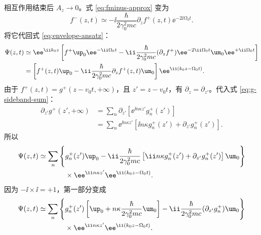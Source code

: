相互作用结束后 $A_z\to0$。式 \eqref{eq:fminus-approx} 变为
\begin{equation}
 f^-(z,t)
 \simeq
 -\ii\frac{\hbar}{2\gamma_0^2mc}
 \partial_zf^+(z,t)\ee^{-2\ii\Omega_0t}.
 \label{eq:fminus-free}
\end{equation}
将它代回式 \eqref{eq:envelope-ansatz}：
\begin{align}
 \Psi(z,t)
 &\simeq\ee^{\ii k_0z}
 \left[
 f^+\up_0\ee^{-\ii\Omega_0t}
 -\ii\frac{\hbar}{2\gamma_0^2mc}
 (\partial_zf^+)\ee^{-2\ii\Omega_0t}
 \um_0\ee^{+\ii\Omega_0t}
 \right]\\
 &=\left[
 f^+(z,t)\up_0
 -\ii\frac{\hbar}{2\gamma_0^2mc}\partial_zf^+(z,t)\um_0
 \right]
 \ee^{\ii(k_0z-\Omega_0t)}.
 \label{eq:psi-after-interaction}
\end{align}
由于 $f^+(z,t)=g^+(z-v_0t,+\infty)$，且 $z'=z-v_0t$，有 $\partial_z=\partial_{z'}$。代入式 \eqref{eq:g-sideband-sum}：
\begin{align}
 \partial_{z'}g^+(z',+\infty)
 &=\sum_n\partial_{z'}\left[
 \ee^{\ii n\kappa z'}g_n^+(z')\right]\\
 &=\sum_n\ee^{\ii n\kappa z'}
 \left[\ii n\kappa g_n^+(z')+\partial_{z'}g_n^+(z')\right].
 \label{eq:g-derivative-sidebands}
\end{align}
所以
\begin{align}
 \Psi(z,t)
 \simeq\sum_n\Bigg\{
 &g_n^+(z')\up_0
 -\ii\frac{\hbar}{2\gamma_0^2mc}
 \left[\ii n\kappa g_n^+(z')+\partial_{z'}g_n^+(z')\right]\um_0
 \Bigg\}\notag\\
 &\times\ee^{\ii n\kappa z'}\ee^{\ii(k_0z-\Omega_0t)}.
\end{align}
因为 $-\ii\times\ii=+1$，第一部分变成
\begin{align}
 \Psi(z,t)
 \simeq\sum_n\Bigg\{
 &g_n^+(z')
 \left[\up_0+n\kappa\frac{\hbar}{2\gamma_0^2mc}\um_0\right]
 -\ii\frac{\hbar}{2\gamma_0^2mc}
 (\partial_{z'}g_n^+)\um_0
 \Bigg\}\notag\\
 &\times\ee^{\ii n\kappa z'}\ee^{\ii(k_0z-\Omega_0t)}.
 \label{eq:psi-before-spinor-repack}
\end{align}

